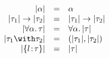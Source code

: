 
\[
\begin{array}{rcl}
  \im \alpha                     & = & \alpha \\
  \im {\tau_1} \to \im {\tau_2} & = & \im {\tau_1} \to \im {\tau_2} \\
  \im {\Forall \alpha \tau}      & = & \Forall \alpha \im \tau \\
  \im {\tau_1 \Intersect \tau_2}   & = & \Pair {\im {\tau_1}} {\im {\tau_2}} \\
  \im {\RecTy l \tau}            & = & \im \tau
\end{array}
\]